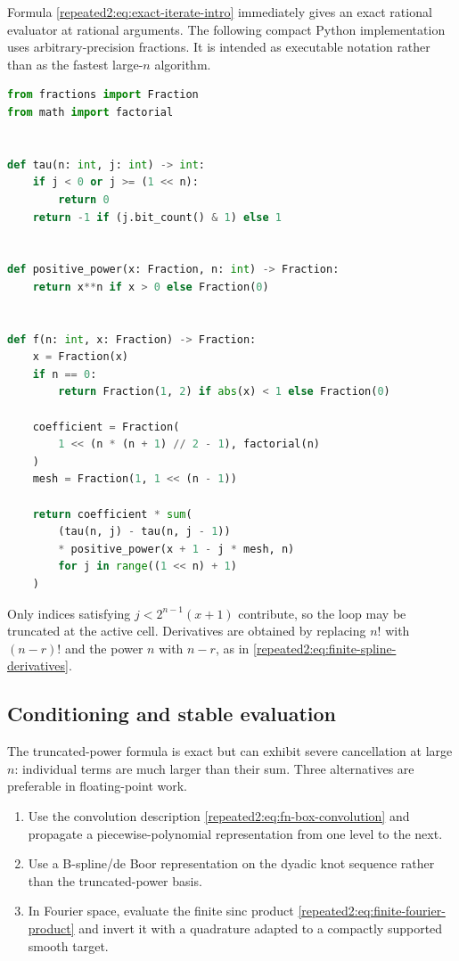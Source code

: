 \documentclass[11pt,oneside]{article}
\theoremstyle{definition}
\theoremstyle{remark}
\begin{document}
Formula \eqref{repeated2:eq:exact-iterate-intro} immediately gives an exact rational evaluator at
rational arguments.  The following compact Python implementation uses arbitrary-precision
fractions.  It is intended as executable notation rather than as the fastest large-$n$
algorithm.

\begin{lstlisting}[style=reportcode,language=Python,caption={Exact evaluation of the finite iterates.},label={repeated2:lst:exact-evaluator}]
from fractions import Fraction
from math import factorial


def tau(n: int, j: int) -> int:
    if j < 0 or j >= (1 << n):
        return 0
    return -1 if (j.bit_count() & 1) else 1


def positive_power(x: Fraction, n: int) -> Fraction:
    return x**n if x > 0 else Fraction(0)


def f(n: int, x: Fraction) -> Fraction:
    x = Fraction(x)
    if n == 0:
        return Fraction(1, 2) if abs(x) < 1 else Fraction(0)

    coefficient = Fraction(
        1 << (n * (n + 1) // 2 - 1), factorial(n)
    )
    mesh = Fraction(1, 1 << (n - 1))

    return coefficient * sum(
        (tau(n, j) - tau(n, j - 1))
        * positive_power(x + 1 - j * mesh, n)
        for j in range((1 << n) + 1)
    )
\end{lstlisting}

Only indices satisfying $j<2^{n-1}(x+1)$ contribute, so the loop may be truncated at the
active cell.  Derivatives are obtained by replacing $n!$ with $(n-r)!$ and the power $n$
with $n-r$, as in \eqref{repeated2:eq:finite-spline-derivatives}.

\subsection{Conditioning and stable evaluation}

The truncated-power formula is exact but can exhibit severe cancellation at large $n$:
individual terms are much larger than their sum.  Three alternatives are preferable in
floating-point work.

\begin{enumerate}[label=\textup{(\roman*)}]
\item Use the convolution description \eqref{repeated2:eq:fn-box-convolution} and propagate a
piecewise-polynomial representation from one level to the next.
\item Use a B-spline/de Boor representation on the dyadic knot sequence rather than the
truncated-power basis.
\item In Fourier space, evaluate the finite sinc product \eqref{repeated2:eq:finite-fourier-product}
and invert it with a quadrature adapted to a compactly supported smooth target.
\end{enumerate}
\end{document}

